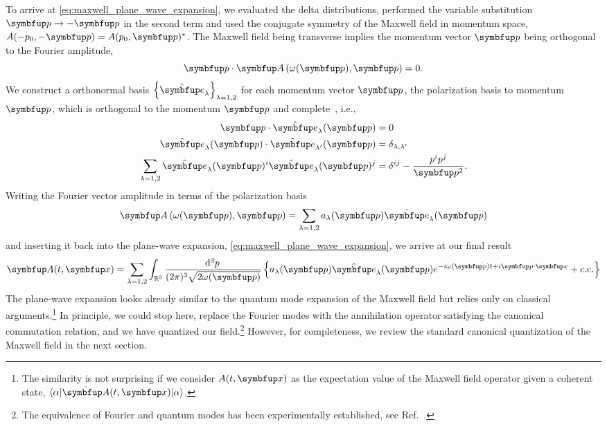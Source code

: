 To arrive at \cref{eq:maxwell_plane_wave_expansion}, we evaluated the delta distributions, performed the variable substitution $\vb{p}\to-\vb{p}$ in the second term and used the conjugate symmetry of the Maxwell field in momentum space, $A(-p_0,-\vb{p})=A(p_0,\vb{p})^*$.
The Maxwell field being transverse implies the momentum vector $\vb{p}$ being orthogonal to the Fourier amplitude,
\begin{equation}
	\vb{p}
	\vdot
	\vb{A}\left(\omega(\vb{p}),\vb{p}\right)
	=
	0
	.
\end{equation}
We construct a orthonormal basis $\left\{\vu{e}_\lambda\right\}_{\lambda=1,2}$ for each momentum vector $\vb{p}$, the polarization basis to momentum $\vb{p}$, which is orthogonal to the momentum $\vb{p}$ and complete~\cite[p.~341]{Srednicki2007}, i.e.,
\begin{align}
	\vb{p}
	\vdot
	\vu{e}_\lambda(\vb{p})
	&=
	0
	\\
	\vu{e}_\lambda(\vb{p})
	\vdot
	\vu{e}_{\lambda^\prime}(\vb{p})
	&=
	\delta_{\lambda,\lambda^\prime}
	\\
	\sum_{\lambda=1,2}
	\vu{e}_\lambda(\vb{p})^i
	\vu{e}_\lambda(\vb{p})^j
	&=
	\delta^{ij}
	-
	\frac{p^ip^j}{\vb{p}^2}
	.
\end{align}
Writing the Fourier vector amplitude in terms of the polarization basis
\begin{equation}
	\vb{A}\left(\omega(\vb{p}),\vb{p}\right)
	=
	\sum_{\lambda=1,2}
	a_\lambda(\vb{p})
	\vu{e}_\lambda(\vb{p})
\end{equation}
and inserting it back into the plane-wave expansion, \cref{eq:maxwell_plane_wave_expansion}, we arrive at our final result
\begin{equation}
	\vb{A}(t,\vb{x})
	=
	\sum_{\lambda=1,2}
	\int_{\mathbb{R}^3}\frac{\dd[3]{p}}{(2\pi)^3\sqrt{2\omega(\vb{p})}}
	\left\{
		a_\lambda(\vb{p})
		\vu{e}_\lambda(\vb{p})
		e^{-i\omega(\vb{p})t+i\vb{p}\vdot\vb{x}}
		+
		\text{c.c.}
	\right\}
	\label{eq:maxwell_expansion}
\end{equation}
The plane-wave expansion looks already similar to the quantum mode expansion of the Maxwell field but relies only on classical arguments.\footnote{The similarity is not surprising if we consider $A(t,\vb{x})$ as the expectation value of the Maxwell field operator given a coherent state, $\bra{\alpha}\vu{A}(t,\vb{x})\ket{\alpha}$.}
In principle, we could stop here, replace the Fourier modes with the annihilation operator satisfying the canonical commutation relation, and we have quantized our field.\footnote{The equivalence of Fourier and quantum modes has been experimentally established, see Ref.~\cite{Hulet1985}.}
However, for completeness, we review the standard canonical quantization of the Maxwell field in the next section.

